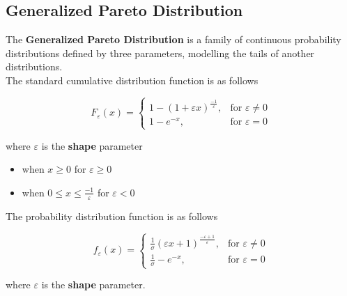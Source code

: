 \documentclass[11pt,a4paper]{article}
\theoremstyle{plain}
\begin{document}
\subsection{Generalized Pareto Distribution}
The \textbf{Generalized Pareto Distribution} is a family of continuous probability distributions defined by three parameters, modelling the tails of another distributions.
\\
The standard cumulative distribution function is as follows
\begin{center}
 \[
     F_{\varepsilon}(x)=\left\{
                \begin{array}{ll}
                  1-(1+\varepsilon x)^{\frac{-1}{\varepsilon}},&\text{for  $\varepsilon \neq 0$}\\
                  1-e^{-x},&\text {for $\varepsilon =0$}
                \end{array}
              \right.
 \]
\end{center}
where $\varepsilon$ is the \textbf{shape} parameter
\begin{itemize}
  \item when $x \geq 0$ for $\varepsilon \geq 0$ 
  \item when $0\leq x \leq \frac{-1}{\varepsilon}$ for $\varepsilon <0$
\end{itemize}

The probability distribution function is as follows
\begin{center}
 \[
     f_{\varepsilon}(x)=\left\{
                \begin{array}{ll}
                  \frac{1}{\sigma}(\varepsilon x + 1)^{\frac{-\varepsilon +1}{\varepsilon}},&\text{for  $\varepsilon \neq 0$}\\
                  \frac{1}{\sigma}-e^{-x},&\text {for $\varepsilon =0$}
                \end{array}
              \right.
 \]
\end{center}
where $\varepsilon$ is the \textbf{shape} parameter.
\end{document}
